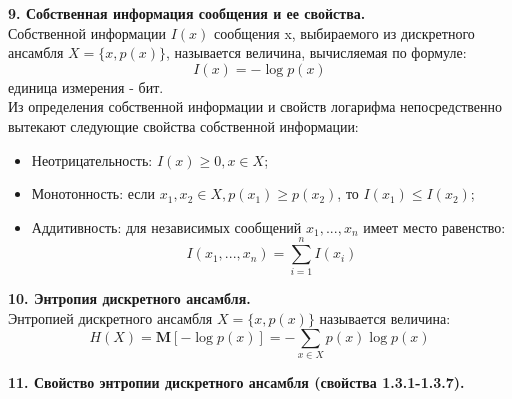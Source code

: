 \documentclass[14pt]{article}
\begin{document}
\bigskip
\textbf{9. Собственная информация сообщения и ее свойства.} \\

Собственной информации \(I(x)\) сообщения x, выбираемого из дискретного ансамбля \(X = \{x, p(x)\}\), называется величина, вычисляемая по формуле: \\
\begin{displaymath}
    I(x) = -\log p(x)
\end{displaymath}
единица измерения - бит. \\

Из определения собственной информации и свойств логарифма непосредственно вытекают следующие свойства собственной информации: \\
\begin{itemize}
    \item Неотрицательность: \(I(x) \geq 0, x \in X\);
    \item Монотонность: если \(x_1, x_2 \in X, p(x_1) \geq p(x_2)\), то \(I(x_1) \leq I(x_2)\);
    \item Аддитивность: для независимых сообщений \( x_1,...,x_n\) имеет место равенство:
    \begin{displaymath}
        I(x_1,...,x_n) = \displaystyle\sum_{i=1}^{n} I(x_i)
    \end{displaymath}
\end{itemize}

\bigskip
\textbf{10. Энтропия дискретного ансамбля.} \\

Энтропией дискретного ансамбля \(X = \{x, p(x)\}\) называется величина: \\
\begin{displaymath}
    H(X) = \textbf{M}[-\log p(x)] = -\displaystyle\sum_{x \in X} p(x)\log p(x)
\end{displaymath}

\bigskip
\textbf{11. Свойство энтропии дискретного ансамбля (свойства 1.3.1-1.3.7).} \\
\end{document}
